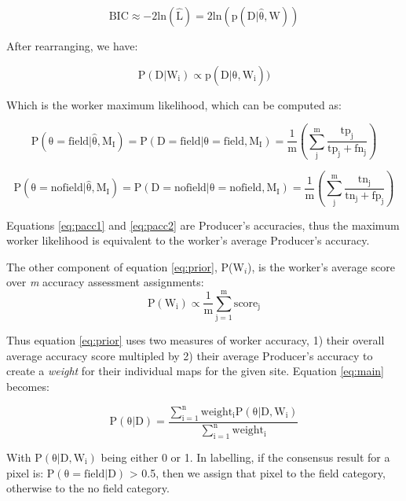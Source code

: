 \documentclass[
  11pt,
  a4paper]{article}
\begin{document}
\begin{equation}
\mathrm{BIC \approx -2ln(\hat{L}) = 2ln(p(D|\hat{\theta}, W))}
\end{equation}

After rearranging, we have:

\begin{equation}
\mathrm{P(D|W_i) \propto p(D|\hat{\theta}, W_i))}
\end{equation}

Which is the worker maximum likelihood, which can be computed as:

\begin{equation} \label{eq:pacc1}
\mathrm{P(\theta = field|\hat{\theta}, M_I) = P(D = field|\theta = field, M_I) = \frac{1}{m}\left(\sum_{j}^{m}\frac{tp_j}{tp_j + fn_j} \right)}
\end{equation}

\begin{equation} \label{eq:pacc2}
\mathrm{P(\theta = no field|\hat{\theta}, M_I) = P(D = no field|\theta = no field, M_I) = \frac{1}{m}\left(\sum_{j}^{m}\frac{tn_j}{tn_j + fp_j} \right)}
\end{equation}

Equations \ref{eq:pacc1} and \ref{eq:pacc2} are Producer's accuracies,
thus the maximum worker likelihood is equivalent to the worker's average
Producer's accuracy.

The other component of equation \ref{eq:prior}, P(W\(_i\)), is the
worker's average score over \emph{m} accuracy assessment assignments:\\
\begin{equation} 
\mathrm{P(W_i) \propto \frac{1}{m}\sum_{j=1}^{m}score_j}
\end{equation}

Thus equation \ref{eq:prior} uses two measures of worker accuracy, 1)
their overall average accuracy score multipled by 2) their average
Producer's accuracy to create a \emph{weight} for their individual maps
for the given site. Equation \ref{eq:main} becomes:

\begin{equation} 
\mathrm{P(\theta|D)=\frac{\sum_{i=1}^{n}weight_iP(\theta|D, W_i)}{\sum_{i=1}^{n}weight_i}}
\end{equation}

With \(\mathrm{P(\theta|D, W_i)}\) being either 0 or 1. In labelling, if
the consensus result for a pixel is: \(\mathrm{P(\theta = field|D)}\)
\textgreater{} 0.5, then we assign that pixel to the field category,
otherwise to the no field category.
\end{document}
